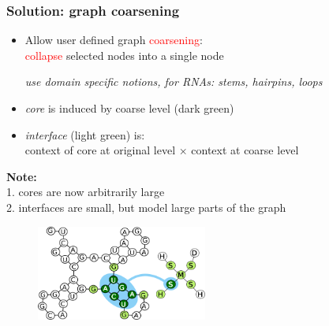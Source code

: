 \documentclass{beamer}
\newcommand{\red}[1]{\textcolor{red}{#1}}
\begin{document}
\begin{frame}
    \frametitle{Solution: graph coarsening}
    \begin{itemize}
        \item Allow user defined graph \red{coarsening}:\\
        \red{collapse} selected nodes into a single node \\
        \begin{small}{\em use domain specific notions, for RNAs: stems, hairpins, loops}\end{small}
        \item {\em core} is induced by coarse level (dark green)
        \item {\em interface} (light green) is: \\context of core at original level $\times$ context at coarse level
   \end{itemize}
    {\bf Note:} \\
    1. cores are now arbitrarily large\\
    2. interfaces are small, but model large parts of the graph
   \begin{figure}[ht]
        \centering
        \includegraphics[width=0.50\textwidth]{images/nucip.png}
    \end{figure}
   
\end{frame}
\end{document}
